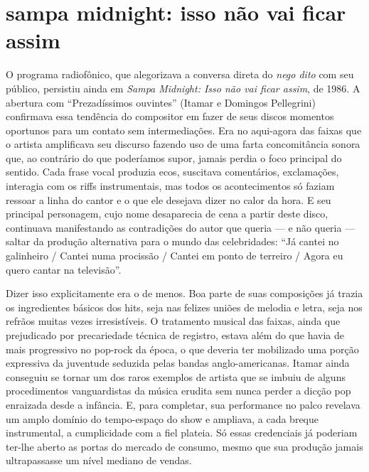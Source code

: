 \section{sampa midnight: isso não vai ficar assim}

O programa radiofônico, que alegorizava a conversa direta do \textit{nego dito}
com seu público, persistiu ainda em \textit{Sampa Midnight: Isso não vai ficar
assim}, de 1986. A abertura com ``Prezadíssimos ouvintes'' (Itamar e Domingos
Pellegrini) confirmava essa tendência do compositor em fazer de seus
discos momentos oportunos para um contato sem intermediações. Era no
aqui-agora das faixas que o artista amplificava seu discurso fazendo uso
de uma farta concomitância sonora que, ao contrário do que poderíamos
supor, jamais perdia o foco principal do sentido. Cada frase vocal
produzia ecos, suscitava comentários, exclamações, interagia com os
riffs instrumentais, mas todos os acontecimentos só faziam ressoar a
linha do cantor e o que ele desejava dizer no calor da hora. E seu
principal personagem, cujo nome desaparecia de cena a partir deste
disco, continuava manifestando as contradições do autor que queria --- e
não queria --- saltar da produção alternativa para o mundo das
celebridades: ``Já cantei no galinheiro / Cantei numa procissão / Cantei
em ponto de terreiro / Agora eu quero cantar na televisão''.

Dizer isso explicitamente era o de menos. Boa parte de suas composições
já trazia os ingredientes básicos dos hits, seja nas felizes uniões de
melodia e letra, seja nos refrãos muitas vezes irresistíveis. O
tratamento musical das faixas, ainda que prejudicado por precariedade
técnica de registro, estava além do que havia de mais progressivo no
pop-rock da época, o que deveria ter mobilizado uma porção expressiva da
juventude seduzida pelas bandas anglo-americanas. Itamar ainda conseguiu
se tornar um dos raros exemplos de artista que se imbuiu de alguns
procedimentos vanguardistas da música erudita sem nunca perder a dicção
pop enraizada desde a infância. E, para completar, sua performance no
palco revelava um amplo domínio do tempo-espaço do show e ampliava, a
cada breque instrumental, a cumplicidade com a fiel plateia. Só essas
credenciais já poderiam ter-lhe aberto as portas do mercado de consumo,
mesmo que sua produção jamais ultrapassasse um nível mediano de vendas.


